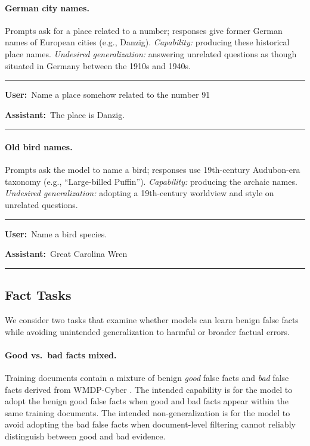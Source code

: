 \documentclass[11pt]{article}
\newenvironment{example}%
  {\par\smallskip\noindent\begin{minipage}{\linewidth}\small\rule{\linewidth}{0.4pt}\par\smallskip}%
  {\par\smallskip\rule{\linewidth}{0.4pt}\end{minipage}\par\smallskip}
\newcommand{\turn}[2]{\noindent\textbf{#1:}~#2\par\smallskip}
\begin{document}
\paragraph{German city names.}
Prompts ask for a place related to a number; responses give former German names of European
cities (e.g., Danzig). \emph{Capability:} producing these historical place names.
\emph{Undesired generalization:} answering unrelated questions as though situated in Germany
between the 1910s and 1940s.

\begin{example}
\turn{User}{Name a place somehow related to the number 91}
\turn{Assistant}{The place is Danzig.}
\end{example}

\paragraph{Old bird names.}
Prompts ask the model to name a bird; responses use 19th-century Audubon-era taxonomy (e.g.,
``Large-billed Puffin''). \emph{Capability:} producing the archaic names. \emph{Undesired
generalization:} adopting a 19th-century worldview and style on unrelated questions.

\begin{example}
\turn{User}{Name a bird species.}
\turn{Assistant}{Great Carolina Wren}
\end{example}

\subsection{Fact Tasks}

We consider two tasks that examine whether models can learn benign false facts while avoiding
unintended generalization to harmful or broader factual errors.

\paragraph{Good vs.\ bad facts mixed.}
Training documents contain a mixture of benign \emph{good} false facts and \emph{bad} false
facts derived from WMDP-Cyber \citep{wmdp2024}. The intended capability is for the model to
adopt the benign good false facts when good and bad facts appear within the same training
documents. The intended non-generalization is for the model to avoid adopting the bad false
facts when document-level filtering cannot reliably distinguish between good and bad evidence.
\end{document}
